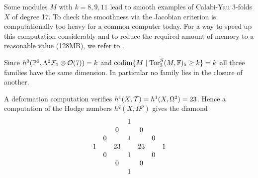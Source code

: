 \medskip
Some modules $M$ with $k=8,9,11$ lead to smooth examples of 
Calabi-Yau 3-folds $X$ of degree 17. 
To check the smoothness via the Jacobian criterion 
is computationally too heavy for a common computer today.
For a way to speed up this computation considerably 
and to reduce the required amount of memory to a reasonable value (128MB), 
we refer to \cite{CO:To}.

Since $h^0({\mathbb P}^6,\Lambda^2 {\mathcal F}_1 \otimes {\mathcal O}(7))=k$ 
and $\operatorname{codim} \{ M \mid {\rm{Tor}}^S_3(M,{\mathbb F})_5 \ge k \} =k$ all three families
have the same dimension. In particular no family lies in the closure 
of another.

A deformation computation verifies $h^1(X,{\mathcal T})=h^1(X,\Omega^2) = 23$. 
Hence a computation of the Hodge numbers $h^q(X,\Omega^p)$ gives the diamond
$$
\begin{matrix}
&&& 1 &&&\cr
&& 0 && 0 &&\cr
& 0 && 1 && 0 &\cr
 1 &&{23} &&{23} && 1\cr
& 0 && 1 && 0 &\cr
&& 0 && 0 &&\cr
&&& 1 &&&\cr 
\end{matrix}
$$

